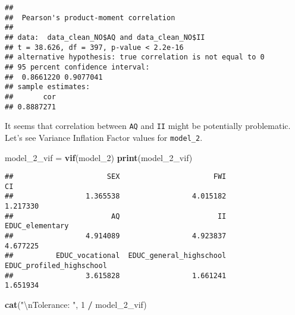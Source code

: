 \documentclass[]{article}
\newenvironment{Shaded}{\begin{snugshade}}{\end{snugshade}}
\newcommand{\CharTok}[1]{\textcolor[rgb]{0.31,0.60,0.02}{#1}}
\newcommand{\DecValTok}[1]{\textcolor[rgb]{0.00,0.00,0.81}{#1}}
\newcommand{\KeywordTok}[1]{\textcolor[rgb]{0.13,0.29,0.53}{\textbf{#1}}}
\newcommand{\NormalTok}[1]{#1}
\newcommand{\OperatorTok}[1]{\textcolor[rgb]{0.81,0.36,0.00}{\textbf{#1}}}
\newcommand{\StringTok}[1]{\textcolor[rgb]{0.31,0.60,0.02}{#1}}
\begin{document}
\begin{Shaded}
\end{Shaded}

\begin{verbatim}
## 
##  Pearson's product-moment correlation
## 
## data:  data_clean_NO$AQ and data_clean_NO$II
## t = 38.626, df = 397, p-value < 2.2e-16
## alternative hypothesis: true correlation is not equal to 0
## 95 percent confidence interval:
##  0.8661220 0.9077041
## sample estimates:
##       cor 
## 0.8887271
\end{verbatim}

It seems that correlation between \texttt{AQ} and \texttt{II} might be
potentially problematic. Let's see Variance Inflation Factor values for
\texttt{model\_2}.

\begin{Shaded}
\begin{Highlighting}[]
\NormalTok{model_}\DecValTok{2}\NormalTok{_vif =}\StringTok{ }\KeywordTok{vif}\NormalTok{(model_}\DecValTok{2}\NormalTok{)}
\KeywordTok{print}\NormalTok{(model_}\DecValTok{2}\NormalTok{_vif)}
\end{Highlighting}
\end{Shaded}

\begin{verbatim}
##                      SEX                      FWI                       CI 
##                 1.365538                 4.015182                 1.217330 
##                       AQ                       II          EDUC_elementary 
##                 4.914089                 4.923837                 4.677225 
##          EDUC_vocational  EDUC_general_highschool EDUC_profiled_highschool 
##                 3.615828                 1.661241                 1.651934
\end{verbatim}

\begin{Shaded}
\begin{Highlighting}[]
\KeywordTok{cat}\NormalTok{(}\StringTok{"}\CharTok{\textbackslash{}n}\StringTok{Tolerance: "}\NormalTok{, }\DecValTok{1} \OperatorTok{/}\StringTok{ }\NormalTok{model_}\DecValTok{2}\NormalTok{_vif)}
\end{Highlighting}
\end{Shaded}
\end{document}
